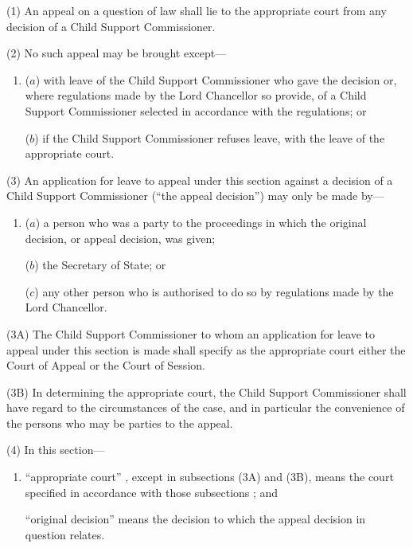 \documentclass[12pt,a4paper]{article}
\begin{document}
(1) An appeal on a question of law shall lie to the appropriate court from any decision of a Child Support Commissioner.

(2) No such appeal may be brought except—
\begin{enumerate}\item[]
($a$) with leave of the Child Support Commissioner who gave the decision or, where regulations made by the Lord Chancellor so provide, of a Child Support Commissioner selected in accordance with the regulations; or

($b$) if the Child Support Commissioner refuses leave, with the leave of the appropriate court.
\end{enumerate}

(3) An application for leave to appeal under this section against a decision of a Child Support Commissioner (“the appeal decision”) may only be made by—
\begin{enumerate}\item[]
($a$) a person who was a party to the proceedings in which the original decision, or appeal decision, was given;

($b$) the Secretary of State; or

($c$) any other person who is authorised to do so by regulations made by the Lord Chancellor.
\end{enumerate}

(3A) The Child Support Commissioner to whom an application for leave to appeal under this section is made shall specify as the appropriate court either the Court of Appeal or the Court of Session.

(3B) In determining the appropriate court, the Child Support Commissioner shall have regard to the circumstances of the case, and in particular the convenience of the persons who may be parties to the appeal.

(4) In this section—
\begin{enumerate}\item[]
    “appropriate court”%
, except in subsections (3A) and (3B), means the court specified in accordance with those subsections%
; and

    “original decision” means the decision to which the appeal decision in question relates. 
\end{enumerate}
\end{document}

